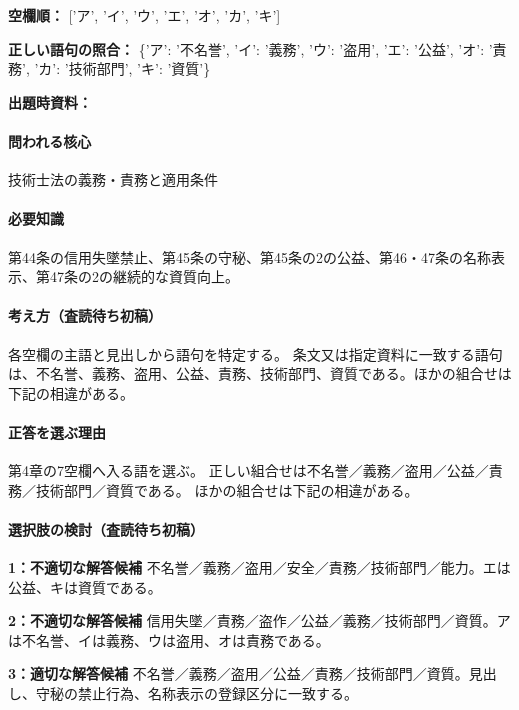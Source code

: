 \noindent\textbf{空欄順：} ['ア', 'イ', 'ウ', 'エ', 'オ', 'カ', 'キ']\par

\noindent\textbf{正しい語句の照合：} \{'ア': '不名誉', 'イ': '義務', 'ウ': '盗用', 'エ': '公益', 'オ': '責務', 'カ': '技術部門', 'キ': '資質'\}\par

\noindent\textbf{出題時資料：} \par

\paragraph{問われる核心} 技術士法の義務・責務と適用条件

\paragraph{必要知識} 第44条の信用失墜禁止、第45条の守秘、第45条の2の公益、第46・47条の名称表示、第47条の2の継続的な資質向上。

\paragraph{考え方（査読待ち初稿）} 各空欄の主語と見出しから語句を特定する。 条文又は指定資料に一致する語句は、不名誉、義務、盗用、公益、責務、技術部門、資質である。ほかの組合せは下記の相違がある。

\paragraph{正答を選ぶ理由} 第4章の7空欄へ入る語を選ぶ。 正しい組合せは不名誉／義務／盗用／公益／責務／技術部門／資質である。 ほかの組合せは下記の相違がある。

\paragraph{選択肢の検討（査読待ち初稿）}\mbox{}\par

\noindent\textbf{1：不適切な解答候補} 不名誉／義務／盗用／安全／責務／技術部門／能力。エは公益、キは資質である。\par

\noindent\textbf{2：不適切な解答候補} 信用失墜／責務／盗作／公益／義務／技術部門／資質。アは不名誉、イは義務、ウは盗用、オは責務である。\par

\noindent\textbf{3：適切な解答候補} 不名誉／義務／盗用／公益／責務／技術部門／資質。見出し、守秘の禁止行為、名称表示の登録区分に一致する。\par

